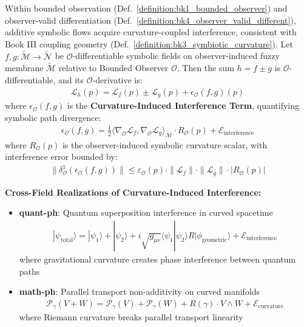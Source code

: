 \begin{theorem}
\label{theorem:bk4_fuzzy_sum_rule}
Within bounded observation (Def.~\ref{definition:bk1_bounded_observer}) and observer-valid differentiation (Def.~\ref{definition:bk4_observer_valid_different}), additive symbolic flows acquire curvature-coupled interference, consistent with Book III coupling geometry (Def.~\ref{definition:bk3_symbiotic_curvature}).
Let $f, g: \tilde{\mathcal{M}} \rightarrow \tilde{\mathcal{N}}$ be $\mathcal{O}$-differentiable symbolic fields on observer-induced fuzzy membrane $\tilde{\mathcal{M}}$ relative to Bounded Observer $\mathcal{O}$. Then the sum $h = f \pm g$ is $\mathcal{O}$-differentiable, and its $\mathcal{O}$-derivative is:
\begin{align}
\mathcal{L}_h(p) = \mathcal{L}_f(p) \pm \mathcal{L}_g(p) + \epsilon_{\mathcal{O}}(f, g)(p)
\end{align}
where $\epsilon_{\mathcal{O}}(f, g)$ is the \textbf{Curvature-Induced Interference Term}, quantifying symbolic path divergence:
\begin{align}
\epsilon_{\mathcal{O}}(f, g) = \frac{1}{2}\langle \nabla_{\mathcal{O}} \mathcal{L}_f, \nabla_{\mathcal{O}} \mathcal{L}_g \rangle_{\tilde{\mathcal{M}}} \cdot R_{\mathcal{O}}(p) + \mathcal{E}_{\text{interference}}
\end{align}
where $R_{\mathcal{O}}(p)$ is the observer-induced symbolic curvature scalar, with interference error bounded by:
\begin{align}
\|\delta^1_{\mathcal{O}}(\epsilon_{\mathcal{O}}(f, g))\| \leq \varepsilon_{\mathcal{O}}(p) \cdot \|\mathcal{L}_f\| \cdot \|\mathcal{L}_g\| \cdot |R_{\mathcal{O}}(p)|
\end{align}

\textbf{Cross-Field Realizations of Curvature-Induced Interference:}

\begin{itemize}
\item \textbf{quant-ph}: Quantum superposition interference in curved spacetime
  \begin{align}
  |\psi_{\text{total}}\rangle = |\psi_1\rangle + |\psi_2\rangle + i\sqrt{g_{\mu\nu}} \langle \psi_1 | \psi_2 \rangle R |\phi_{\text{geometric}}\rangle + \mathcal{E}_{\text{interference}}
  \end{align}
  where gravitational curvature creates phase interference between quantum paths
  
\item \textbf{math-ph}: Parallel transport non-additivity on curved manifolds
  \begin{align}
  \mathcal{P}_{\gamma}(V + W) = \mathcal{P}_{\gamma}(V) + \mathcal{P}_{\gamma}(W) + R(\gamma) \cdot V \wedge W + \mathcal{E}_{\text{curvature}}
  \end{align}
  where Riemann curvature breaks parallel transport linearity
  

\end{itemize}
\end{theorem}
